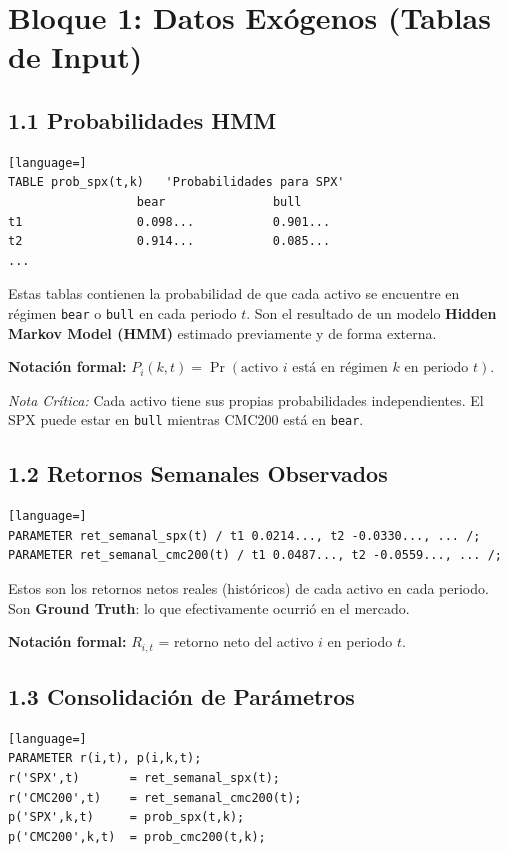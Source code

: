 \documentclass[11pt,a4paper]{article}
\begin{document}
\section{Bloque 1: Datos Exógenos (Tablas de Input)}

\subsection{1.1 Probabilidades HMM}
\begin{lstlisting}[language=]
TABLE prob_spx(t,k)   'Probabilidades para SPX'
                  bear               bull
t1                0.098...           0.901...
t2                0.914...           0.085...
...
\end{lstlisting}

Estas tablas contienen la probabilidad de que cada activo se encuentre en régimen \texttt{bear} o \texttt{bull} en cada periodo $t$. Son el resultado de un modelo \textbf{Hidden Markov Model (HMM)} estimado previamente y de forma externa.

\textbf{Notación formal:} $P_i(k, t) = \Pr(\text{activo } i \text{ está en régimen } k \text{ en periodo } t)$.

\textit{Nota Crítica:} Cada activo tiene sus propias probabilidades independientes. El SPX puede estar en \texttt{bull} mientras CMC200 está en \texttt{bear}.

\subsection{1.2 Retornos Semanales Observados}
\begin{lstlisting}[language=]
PARAMETER ret_semanal_spx(t) / t1 0.0214..., t2 -0.0330..., ... /;
PARAMETER ret_semanal_cmc200(t) / t1 0.0487..., t2 -0.0559..., ... /;
\end{lstlisting}

Estos son los retornos netos reales (históricos) de cada activo en cada periodo. Son \textbf{Ground Truth}: lo que efectivamente ocurrió en el mercado.

\textbf{Notación formal:} $R_{i,t}$ = retorno neto del activo $i$ en periodo $t$.

\subsection{1.3 Consolidación de Parámetros}
\begin{lstlisting}[language=]
PARAMETER r(i,t), p(i,k,t);
r('SPX',t)       = ret_semanal_spx(t);
r('CMC200',t)    = ret_semanal_cmc200(t);
p('SPX',k,t)     = prob_spx(t,k);
p('CMC200',k,t)  = prob_cmc200(t,k);
\end{lstlisting}
\end{document}
